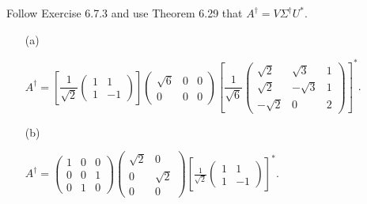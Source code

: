 \begin{Exercise}
	Follow Exercise 6.7.3 and use Theorem 6.29 that $A^{\dagger} = V \Sigma^{\dagger} U^*$.
	\begin{enumerate}[(a)]
		\item[(a)]
		\begin{answer}
			$ A^{\dagger} = \left[\dfrac{1}{\sqrt{2}}\begin{pmatrix}
			1 & 1 \\
			1 & -1
			\end{pmatrix}\right] \begin{pmatrix}
			\sqrt{6} & 0 & 0 \\
			0 & 0 & 0
			\end{pmatrix} \left[\dfrac{1}{\sqrt{6}}\begin{pmatrix}
			\sqrt{2} & \sqrt{3} & 1 \\
			\sqrt{2} & -\sqrt{3} & 1 \\
			-\sqrt{2} & 0 & 2
			\end{pmatrix}\right]^*$.
		\end{answer}
		
		\item[(b)]
		\begin{answer}
			$ A^{\dagger} = \begin{pmatrix}
			1 & 0 & 0 \\
			0 & 0 & 1 \\
			0 & 1 & 0
			\end{pmatrix}  \begin{pmatrix}
			\sqrt{2} & 0 \\
			0 & \sqrt{2} \\
			0 & 0
			\end{pmatrix} \left[ \frac{1}{\sqrt{2}}\begin{pmatrix}
			1 & 1 \\
			1 & -1
			\end{pmatrix}\right]^*$.
		\end{answer}
	\end{enumerate}
\end{Exercise}